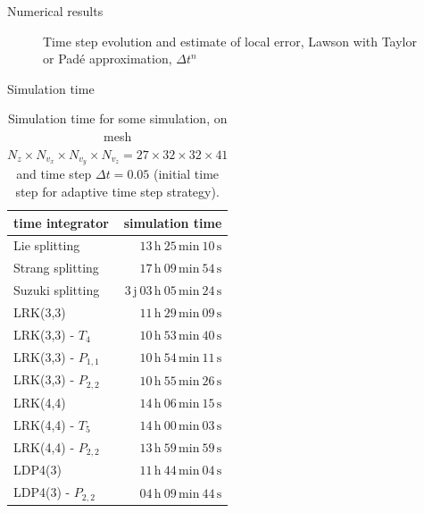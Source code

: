 \documentclass{beamer}
\begin{document}
\begin{frame}{Numerical results}
{\begin{figure}
      \caption{Time step evolution and estimate of local error, Lawson with Taylor or Padé approximation, $\Delta t^n$}
    \end{figure}
  }
\end{frame}
  \begin{frame}{Simulation time}
  \begin{table}[h]
    \centering
    \begin{tabular}{l|r}
      time integrator & simulation time \\
      \hline
      Lie splitting        &                $13\,\text{h}\ 25\,\text{min}\ 10\,\text{s}$ \\
      Strang splitting     &                $17\,\text{h}\ 09\,\text{min}\ 54\,\text{s}$ \\
      Suzuki splitting     &   $3\,\text{j}\ 03\,\text{h}\ 05\,\text{min}\ 24\,\text{s}$ \\
      \hline
      LRK(3,3)             &                $11\,\text{h}\ 29\,\text{min}\ 09\,\text{s}$ \\
      LRK(3,3) - $T_4$     &                $10\,\text{h}\ 53\,\text{min}\ 40\,\text{s}$ \\
      LRK(3,3) - $P_{1,1}$ &                $10\,\text{h}\ 54\,\text{min}\ 11\,\text{s}$ \\
      LRK(3,3) - $P_{2,2}$ &                $10\,\text{h}\ 55\,\text{min}\ 26\,\text{s}$ \\
      \hline
      LRK(4,4)             &                $14\,\text{h}\ 06\,\text{min}\ 15\,\text{s}$ \\
      LRK(4,4) - $T_5$     &                $14\,\text{h}\ 00\,\text{min}\ 03\,\text{s}$ \\
      LRK(4,4) - $P_{2,2}$ &                $13\,\text{h}\ 59\,\text{min}\ 59\,\text{s}$ \\
      \hline
      LDP4(3)              &                $11\,\text{h}\ 44\,\text{min}\ 04\,\text{s}$ \\
      LDP4(3) - $P_{2,2}$  &                $04\,\text{h}\ 09\,\text{min}\ 44\,\text{s}$ \\
    \end{tabular}
    \caption{Simulation time for some simulation, on mesh $N_z \times N_{v_x} \times N_{v_y} \times N_{v_z}=27\times32\times32\times41$ and time step $\Delta t = 0.05$ (initial time step for adaptive time step strategy).}
  \end{table}
\end{frame}

\end{document}
